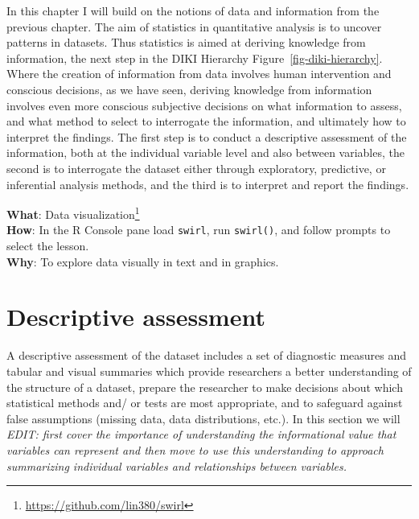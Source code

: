 \documentclass[
  letterpaper,
]{latex/krantz}
\DeclareRobustCommand{\href}[2]{#2\footnote{\url{#1}}}
\begin{document}
In this chapter I will build on the notions of data and information from
the previous chapter. The aim of statistics in quantitative analysis is
to uncover patterns in datasets. Thus statistics is aimed at deriving
knowledge from information, the next step in the DIKI Hierarchy
Figure~\ref{fig-diki-hierarchy}. Where the creation of information from
data involves human intervention and conscious decisions, as we have
seen, deriving knowledge from information involves even more conscious
subjective decisions on what information to assess, and what method to
select to interrogate the information, and ultimately how to interpret
the findings. The first step is to conduct a descriptive assessment of
the information, both at the individual variable level and also between
variables, the second is to interrogate the dataset either through
exploratory, predictive, or inferential analysis methods, and the third
is to interpret and report the findings.

\begin{tcolorbox}[enhanced jigsaw, colframe=quarto-callout-tip-color-frame, titlerule=0mm, coltitle=black, colback=white, opacitybacktitle=0.6, colbacktitle=quarto-callout-tip-color!10!white, left=2mm, arc=.35mm, leftrule=.75mm, rightrule=.15mm, bottomtitle=1mm, toptitle=1mm, breakable, bottomrule=.15mm, title=\textcolor{quarto-callout-tip-color}{\faLightbulb}\hspace{0.5em}{Interactive programming}, toprule=.15mm, opacityback=0]

\textbf{What}: \href{https://github.com/lin380/swirl}{Data
visualization}\\
\textbf{How}: In the R Console pane load \texttt{swirl}, run
\texttt{swirl()}, and follow prompts to select the lesson.\\
\textbf{Why}: To explore data visually in text and in graphics.

\end{tcolorbox}

\hypertarget{aa-descriptive-assessment}{%
\section{Descriptive assessment}\label{aa-descriptive-assessment}}

A descriptive assessment of the dataset includes a set of diagnostic
measures and tabular and visual summaries which provide researchers a
better understanding of the structure of a dataset, prepare the
researcher to make decisions about which statistical methods and/ or
tests are most appropriate, and to safeguard against false assumptions
(missing data, data distributions, etc.). In this section we will
\emph{EDIT: first cover the importance of understanding the
informational value that variables can represent and then move to use
this understanding to approach summarizing individual variables and
relationships between variables.}
\end{document}
